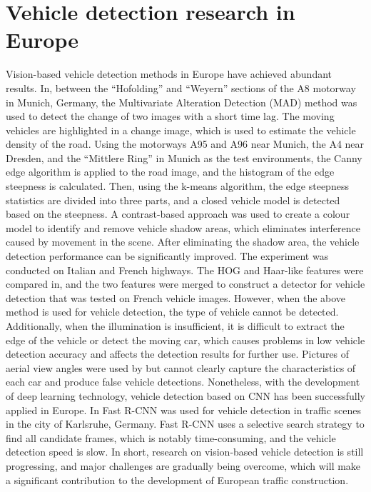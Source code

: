 \begin{sloppypar}
\section{Vehicle detection research in Europe}
Vision-based vehicle detection methods in Europe have achieved abundant results. In, between the “Hofolding” and “Weyern” sections of the A8 motorway in Munich, Germany, the Multivariate Alteration Detection (MAD) method was used to detect the change of two images with a short time lag. The moving vehicles are highlighted in a change image, which is used to estimate the vehicle density of the road. Using the motorways A95 and A96 near Munich, the A4 near Dresden, and the “Mittlere Ring” in Munich as the test environments, the Canny edge algorithm is applied to the road image, and the histogram of the edge steepness is calculated. Then, using the k-means algorithm, the edge steepness statistics are divided into three parts, and a closed vehicle model is detected based on the steepness. A contrast-based approach was used to create a colour model to identify and remove vehicle shadow areas, which eliminates interference caused by movement in the scene. After eliminating the shadow area, the vehicle detection performance can be significantly improved. The experiment was conducted on Italian and French highways. The HOG and Haar-like features were compared in, and the two features were merged to construct a detector for vehicle detection that was tested on French vehicle images. However, when the above method is used for vehicle detection, the type of vehicle cannot be detected. Additionally, when the illumination is insufficient, it is difficult to extract the edge of the vehicle or detect the moving car, which causes problems in low vehicle detection accuracy and affects the detection results for further use. Pictures of aerial view angles were used by but cannot clearly capture the characteristics of each car and produce false vehicle detections.
Nonetheless, with the development of deep learning technology, vehicle detection based on CNN has been successfully applied in Europe. In Fast R-CNN was used for vehicle detection in traffic scenes in the city of Karlsruhe, Germany. Fast R-CNN uses a selective search strategy to find all candidate frames, which is notably time-consuming, and the vehicle detection speed is slow.
In short, research on vision-based vehicle detection is still progressing, and major challenges are gradually being overcome, which will make a significant contribution to the development of European traffic construction.


\end{sloppypar}

